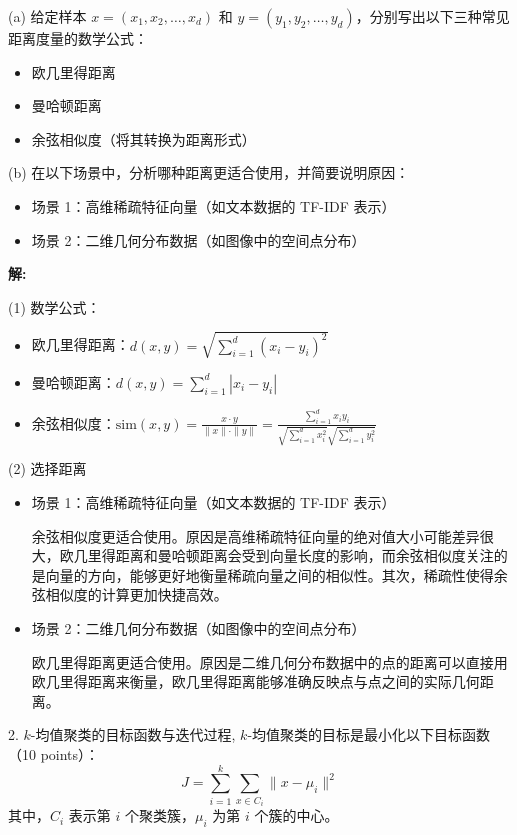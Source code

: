 \documentclass[8pt]{article}
\begin{document}
(a) 给定样本 \( x = (x_1, x_2, \dots, x_d) \) 和 \( y = (y_1, y_2, \dots, y_d) \)，分别写出以下三种常见距离度量的数学公式： 
\begin{itemize}
    \item 欧几里得距离  
    \item 曼哈顿距离
    \item 余弦相似度（将其转换为距离形式）  
\end{itemize}

(b) 在以下场景中，分析哪种距离更适合使用，并简要说明原因：  
\begin{itemize}
    \item 场景 1：高维稀疏特征向量（如文本数据的 TF-IDF 表示）   
    \item 场景 2：二维几何分布数据（如图像中的空间点分布）  
\end{itemize}

\textbf{\large 解:}

(1) 数学公式：
\begin{itemize}
    \item 欧几里得距离：\( d(x, y) = \sqrt{\sum_{i=1}^d (x_i - y_i)^2} \)
    \item 曼哈顿距离：\( d(x, y) = \sum_{i=1}^d |x_i - y_i| \)
    \item 余弦相似度：\( \text{sim}(x, y) = \frac{x \cdot y}{\|x\| \cdot \|y\|} = \frac{\sum_{i=1}^{d}{x_i y_i}}{
        \sqrt{\sum_{i=1}^{d}{x_i^2}} \sqrt{\sum_{i=1}^{d}{y_i^2}}
    } \) 
\end{itemize}

(2) 选择距离

\begin{itemize}
    \item 场景 1：高维稀疏特征向量（如文本数据的 TF-IDF 表示）

    余弦相似度更适合使用。原因是高维稀疏特征向量的绝对值大小可能差异很大，欧几里得距离和曼哈顿距离会受到向量长度的影响，而余弦相似度关注的是向量的方向，能够更好地衡量稀疏向量之间的相似性。其次，稀疏性使得余弦相似度的计算更加快捷高效。

    \item 场景 2：二维几何分布数据（如图像中的空间点分布）

    欧几里得距离更适合使用。原因是二维几何分布数据中的点的距离可以直接用欧几里得距离来衡量，欧几里得距离能够准确反映点与点之间的实际几何距离。
\end{itemize}
\vspace{3em}

2. \( k \)-均值聚类的目标函数与迭代过程, \( k \)-均值聚类的目标是最小化以下目标函数（10 points）：  
\[
J = \sum_{i=1}^k \sum_{x \in C_i} \|x - \mu_i\|^2
\]  
其中，\( C_i \) 表示第 \( i \) 个聚类簇，\( \mu_i \) 为第 \( i \) 个簇的中心。  
\end{document}
